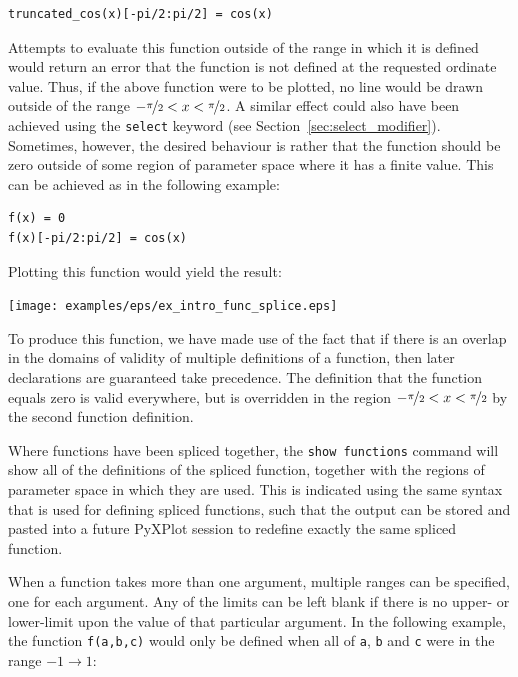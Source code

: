\begin{verbatim}
truncated_cos(x)[-pi/2:pi/2] = cos(x)
\end{verbatim}

\noindent Attempts to evaluate this function outside of the range in which it
is defined would return an error that the function is not defined at the
requested ordinate value. Thus, if the above function were to be plotted, no
line would be drawn outside of the range
$-\nicefrac{\pi}{2}<x<\nicefrac{\pi}{2}$. A similar effect could also have been
achieved using the {\tt select} keyword (see
Section~\ref{sec:select_modifier}). Sometimes, however, the desired behaviour
is rather that the function should be zero outside of some region of parameter
space where it has a finite value. This can be achieved as in the following
example:

\begin{verbatim}
f(x) = 0
f(x)[-pi/2:pi/2] = cos(x)
\end{verbatim}

\noindent Plotting this function would yield the result:

\begin{center}
\texttt{[image: examples/eps/ex\_intro\_func\_splice.eps]}
\end{center}

\noindent To produce this function, we have made use of the fact that if there
is an overlap in the domains of validity of multiple definitions of a function,
then later declarations are guaranteed take precedence. The definition that the
function equals zero is valid everywhere, but is overridden in the region
$-\nicefrac{\pi}{2}<x<\nicefrac{\pi}{2}$ by the second function definition.

Where functions have been spliced together, the {\tt show functions} command
will show all of the definitions of the spliced function, together with the
regions of parameter space in which they are used. This is indicated using the
same syntax that is used for defining spliced functions, such that the output can
be stored and pasted into a future PyXPlot session to redefine exactly the same
spliced function.

When a function takes more than one argument, multiple ranges can be specified,
one for each argument. Any of the limits can be left blank if there is no
upper- or lower-limit upon the value of that particular argument. In the
following example, the function {\tt f(a,b,c)} would only be defined when all
of {\tt a}, {\tt b} and {\tt c} were in the range $-1 \to 1$:

